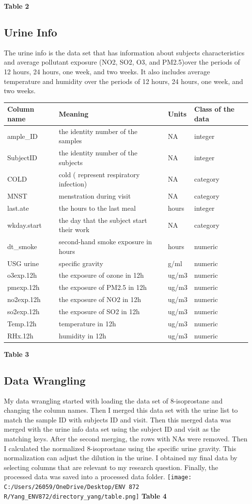 \documentclass[12pt,]{article}
\begin{document}
\center \textbf{Table 2} \center 

\hypertarget{urine-info}{%
\subsection{Urine Info}\label{urine-info}}

The urine info is the data set that has information about subjects
characteristics and average pollutant exposure (NO2, SO2, O3, and
PM2.5)over the periods of 12 hours, 24 hours, one week, and two weeks.
It also includes average temperature and humidity over the periods of 12
hours, 24 hours, one week, and two weeks.

\begin{longtable}[]{@{}llll@{}}
\toprule
Column name & Meaning & Units & Class of the data\tabularnewline
\midrule
\endhead
ample\_ID & the identity number of the samples & NA &
integer\tabularnewline
SubjectID & the identity number of the subjects & NA &
integer\tabularnewline
COLD & cold ( represent respiratory infection) & NA &
category\tabularnewline
MNST & menstration during visit & NA & category\tabularnewline
last.ate & the hours to the last meal & hours & integer\tabularnewline
wkday.start & the day that the subject start their work & NA &
category\tabularnewline
dt\_smoke & second-hand smoke exposure in hours & hours &
numeric\tabularnewline
USG urine & specific gravity & g/ml & numeric\tabularnewline
o3exp.12h & the exposure of ozone in 12h & ug/m3 &
numeric\tabularnewline
pmexp.12h & the exposure of PM2.5 in 12h & ug/m3 &
numeric\tabularnewline
no2exp.12h & the exposure of NO2 in 12h & ug/m3 & numeric\tabularnewline
so2exp.12h & the exposure of SO2 in 12h & ug/m3 & numeric\tabularnewline
Temp.12h & temperature in 12h & ug/m3 & numeric\tabularnewline
RHx.12h & humidity in 12h & ug/m3 & numeric\tabularnewline
\bottomrule
\end{longtable}

\center \textbf{Table 3} \center 

\hypertarget{data-wrangling}{%
\subsection{Data Wrangling}\label{data-wrangling}}

My data wrangling started with loading the data set of 8-isoprostane and
changing the column names. Then I merged this data set with the urine
list to match the sample ID with subjects ID and visit. Then this merged
data was merged with the urine info data set using the subject ID and
visit as the matching keys. After the second merging, the rows with NAs
were removed. Then I calculated the normalized 8-isoprostane using the
specific urine gravity. This normalization can adjust the dilution in
the urine. I obtained my final data by selecting columns that are
relevant to my research question. Finally, the processed data was saved
into a processed data folder.
\texttt{[image: C:/Users/26059/OneDrive/Desktop/ENV 872 R/Yang\_ENV872/directory\_yang/table.png]}
\center \textbf{Table 4} \center 
\end{document}
